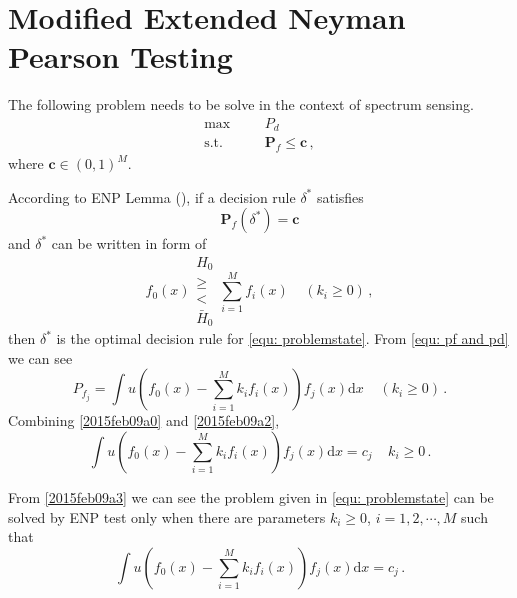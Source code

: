 
\section{Modified Extended Neyman Pearson Testing}

\def \JUDGEMENT{u(f_0(x) - \sum_{j=1}^{M}k_j f_j(x))}

The following problem needs to be solve in the context of spectrum sensing. 
      \begin{equation}
      \label{equ: problemstate}
      \begin{split}
      \max\;\;\;\;\;\;&P_d\\
      \text{s.t.}\;\;\;\;\;\;&\mathbf{P}_f \leq \mathbf{c}\,,
      \end{split}
      \end{equation}
where $\mathbf{c} \in (0, 1)^M$.

According to ENP Lemma (), if a decision rule $\delta^\ast$ satisfies 
\begin{equation}
  \label{2015feb09a0}
  \mathbf{P}_f(\delta^\ast) = \mathbf{c}
\end{equation}
and $\delta^\ast$ can be written in form of 
\begin{equation}
  \label{2015feb09a1}
  f_0(x) \substack{H_0 \\ \geq \\ < \\ \bar{H}_0} \sum_{i=1}^{M}f_i(x)\;\;\;\;(k_i \geq 0)\,,
\end{equation}
then $\delta^\ast$ is the optimal decision rule for \eqref{equ: problemstate}. From \eqref{equ: pf and pd}  we can see 
\begin{equation}
  \label{2015feb09a2}
  P_{f_j} = \int u(f_0(x) - \sum_{i=1}^{M}k_if_i(x))f_j(x)\mathrm{d}x \;\;\;\;(k_i \geq 0)\,.
\end{equation}
Combining \eqref{2015feb09a0} and \eqref{2015feb09a2},
\begin{equation}
\int u(f_0(x) - \sum_{i=1}^{M}k_if_i(x))f_j(x)\mathrm{d}x = c_j\;\;\;\;k_i \geq 0\,.
\label{2015feb09a3}
\end{equation}

From \eqref{2015feb09a3} we can see the problem given in \eqref{equ: problemstate} can be solved by ENP test only when there are parameters $k_i \geq 0$, $i = 1, 2, \cdots, M$ such that  
\begin{equation}
\int u(f_0(x) - \sum_{i=1}^{M}k_if_i(x))f_j(x)\mathrm{d}x = c_j\,.
\label{equ: condition for ENP}
\end{equation}

